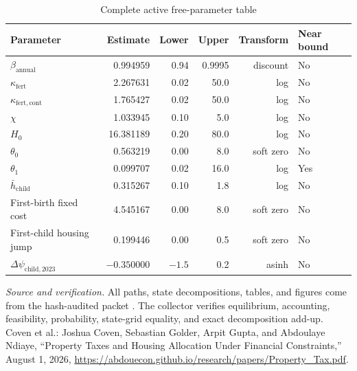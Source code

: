 \documentclass[10pt]{article}
\begin{document}
\begin{table}[h]
\centering
\caption{Complete active free-parameter table}
\scriptsize
\begin{tabular}{lrrrrl}
\toprule
Parameter & Estimate & Lower & Upper & Transform & Near bound \\
\midrule
$\beta_{\mathrm{annual}}$ & 0.994959 & 0.94 & 0.9995 & discount & No \\
$\kappa_{\mathrm{fert}}$ & 2.267631 & 0.02 & 50.0 & log & No \\
$\kappa_{\mathrm{fert,cont}}$ & 1.765427 & 0.02 & 50.0 & log & No \\
$\chi$ & 1.033945 & 0.10 & 5.0 & log & No \\
$H_0$ & 16.381189 & 0.20 & 80.0 & log & No \\
$\theta_0$ & 0.563219 & 0.00 & 8.0 & soft zero & No \\
$\theta_1$ & 0.099707 & 0.02 & 16.0 & log & Yes \\
$\bar h_{\mathrm{child}}$ & 0.315267 & 0.10 & 1.8 & log & No \\
First-birth fixed cost & 4.545167 & 0.00 & 8.0 & soft zero & No \\
First-child housing jump & 0.199446 & 0.00 & 0.5 & soft zero & No \\
$\Delta\psi_{\mathrm{child},2023}$ & $-0.350000$ & $-1.5$ & 0.2 & asinh & No \\
\bottomrule
\end{tabular}
\end{table}

\vfill
\footnotesize
\textit{Source and verification.} All paths, state decompositions, tables, and figures come from the hash-audited packet . The collector verifies equilibrium, accounting, feasibility, probability, state-grid equality, and exact decomposition add-up. Coven et al.: Joshua Coven, Sebastian Golder, Arpit Gupta, and Abdoulaye Ndiaye, ``Property Taxes and Housing Allocation Under Financial Constraints,'' August 1, 2026, \url{https://abdouecon.github.io/research/papers/Property_Tax.pdf}.
\end{document}
